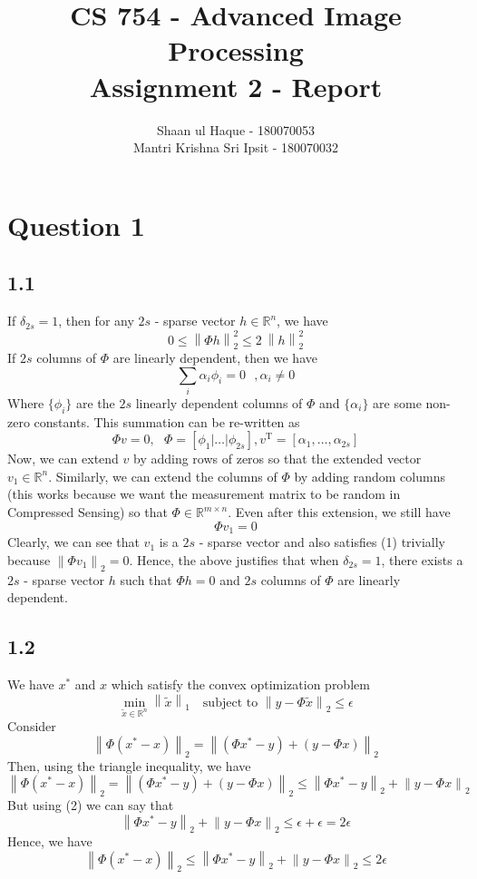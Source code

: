 \documentclass[12pt]{article}
\title{CS 754 - Advanced Image Processing\\Assignment 2 - Report}
\author{Shaan ul Haque - 180070053\\Mantri Krishna Sri Ipsit - 180070032}
\newcommand{\norm}[1]{\left\lVert #1 \right\rVert}
\newcommand{\R}{\mathbb{R}}
\begin{document}
\maketitle

\section*{Question 1}
\subsection*{1.1}
If $\delta_{2s} = 1$, then for any $2s$ - sparse vector $h \in \R^n$, we have
\begin{equation}
0 \leq \norm{\Phi h}_2^2 \leq 2\: \norm{h}_2^2
\end{equation}
If $2s$ columns of $\Phi$ are linearly dependent, then we have
$$\sum_i \alpha_i \phi_i = 0 \:\:\:, \alpha_i \neq0$$
Where $\{\phi_i\}$ are the $2s$ linearly dependent columns of $\Phi$ and $\{\alpha_i\}$ are some non-zero constants. This summation can be re-written as
$$\Phi v = 0, \:\:\: \Phi = [\phi_1| \ldots |\phi_{2s}], v^{\text{T}} = [\alpha_1, \ldots, \alpha_{2s}]$$
Now, we can extend $v$ by adding rows of zeros so that the extended vector $v_1 \in \R^n$. Similarly, we can extend the columns of $\Phi$ by adding random columns (this works because we want the measurement matrix to be random in Compressed Sensing) so that $\Phi \in \R^{m \times n}$. Even after this extension, we still have
$$\Phi v_1 = 0$$
Clearly, we can see that $v_1$ is a $2s$ - sparse vector and also satisfies (1) trivially because $\norm{\Phi v_1}_2 = 0$.
Hence, the above justifies that when $\delta_{2s} = 1$, there exists a $2s$ - sparse vector $h$ such that $\Phi h = 0$ and $2s$ columns of $\Phi$ are linearly dependent.  
\subsection*{1.2}
We have $x^*$ and $x$ which satisfy the convex optimization problem
\begin{equation}
\min _{\tilde{x}\in \R^n} \norm{\tilde{x}}_1 \:\:\: \text{ subject to } \norm{y - \Phi \tilde{x}}_2 \leq \epsilon
\end{equation}
Consider
$$\norm{\Phi(x^* - x)}_2 = \norm{(\Phi x^* - y) + (y - \Phi x)}_2$$
Then, using the triangle inequality, we have
$$\norm{\Phi(x^* - x)}_2 = \norm{(\Phi x^* - y) + (y - \Phi x)}_2 \leq \norm{\Phi x^* - y}_2 + \norm{y-\Phi x}_2$$
But using (2) we can say that
$$\norm{\Phi x^* - y}_2 + \norm{y-\Phi x}_2 \leq \epsilon + \epsilon = 2\epsilon$$
Hence, we have
$$\norm{\Phi(x^* - x)}_2 \leq \norm{\Phi x^* - y}_2 + \norm{y-\Phi x}_2 \leq 2\epsilon$$
\end{document}
